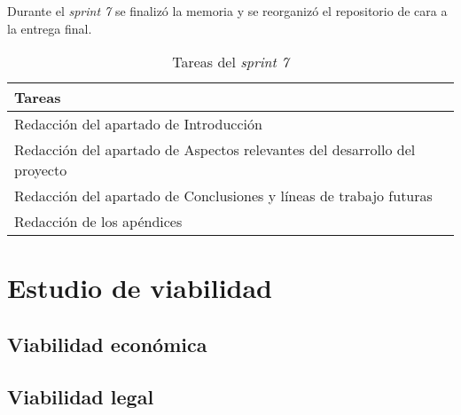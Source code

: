 Durante el \textit{sprint 7} se finalizó la memoria y se reorganizó el repositorio de cara a la entrega final.

\begin{table}[H]
    \centering
    \begin{tabular}{l}
    \hline
    \textbf{Tareas} \\ \hline
    Redacción del apartado de Introducción \\
    Redacción del apartado de Aspectos relevantes del desarrollo del proyecto \\
    Redacción del apartado de Conclusiones y líneas de trabajo futuras \\
    Redacción de los apéndices \\ \hline
    \end{tabular}
    \caption{Tareas del \textit{sprint 7}}
    \label{tab:tasks_sprint7}
\end{table}

\section{Estudio de viabilidad}

\subsection{Viabilidad económica}

\subsection{Viabilidad legal}


